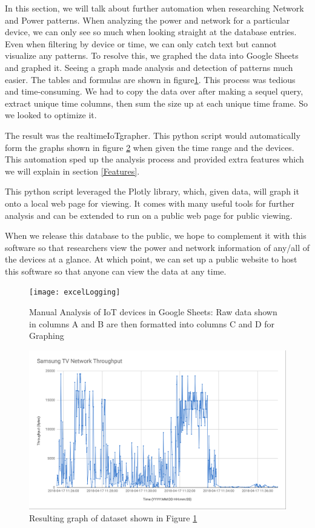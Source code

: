 In this section, we will talk about further automation when researching Network and Power patterns. When analyzing the power and network for a particular device, we can only see so much when looking straight at the database entries. Even when filtering by device or time, we can only catch text but cannot visualize any patterns. To resolve this, we graphed the data into Google Sheets and graphed it. Seeing a graph made analysis and detection of patterns much easier. The tables and formulas are shown in figure\ref{fig:excelLogging}. This process was tedious and time-consuming. We had to copy the data over after making a sequel query, extract unique time columns, then sum the size up at each unique time frame. So we looked to optimize it.

The result was the realtimeIoTgrapher. This python script would automatically form the graphs shown in figure \ref{fig:tvThroughput} when given the time range and the devices. This automation sped up the analysis process and provided extra features which we will explain in section \ref{Features}.

This python script leveraged the Plotly library, which, given data, will graph it onto a local web page for viewing. It comes with many useful tools for further analysis and can be extended to run on a public web page for public viewing.

When we release this database to the public, we hope to complement it with this software so that researchers view the power and network information of any/all of the devices at a glance. At which point, we can set up a public website to host this software so that anyone can view the data at any time.

\begin{figure}[H]
    \centering
    \texttt{[image: excelLogging]}
    \caption{Manual Analysis of IoT devices in Google Sheets: Raw data shown in columns A and B are then formatted into columns C and D for Graphing}
    \label{fig:excelLogging}
\end{figure}

\begin{figure}[H]
    \centering
    \includegraphics[width=1\textwidth]{figures/tvThroughput.png}
    \caption{Resulting graph of dataset shown in Figure \ref{fig:excelLogging}}
    \label{fig:tvThroughput}
\end{figure}

